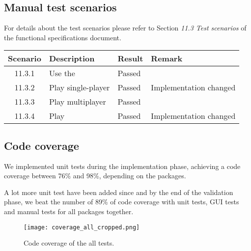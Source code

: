 \subsection{Manual test scenarios}

For details about the test scenarios please refer to Section \emph{11.3 Test scenarios} of the functional specifications document.\par

\begin{tabular}{clll}

\hline
	\textbf{Scenario} & \textbf{Description} & \textbf{Result} & \textbf{Remark} \\
	\hline
	11.3.1 & Use the \gameexplorer & Passed & \\
	11.3.2 & Play \graphcoloring single-player & Passed & Implementation changed \footnotemark \\
	11.3.3 & Play \graphcoloring multiplayer & Passed & \\
	11.3.4 & Play \twixt & Passed & Implementation changed \footnotemark \\
	\hline
\end{tabular}


\pagebreak
\subsection{Code coverage}
\label{section:code-coverage}
We implemented unit tests during the implementation phase, achieving a code coverage between 76\% and 98\%, depending on the packages.\par
A lot more unit test have been added since and by the end of the validation phase, we beat the number of 89\%  of code coverage with unit tests, GUI tests and manual tests for all packages together.\par


\begin{figure}[!h]
	\centering
	\texttt{[image: coverage\_all\_cropped.png]}
	\caption{Code coverage of the all tests.}
	\label{img:codeCoverage}
\end{figure}

